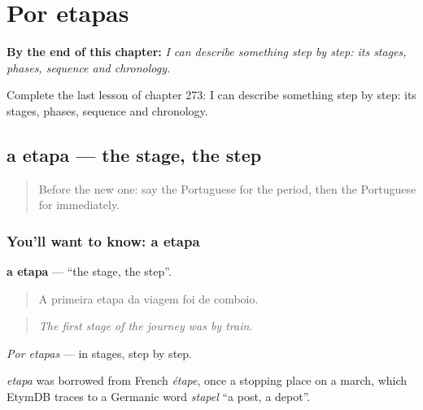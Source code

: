 
\chapter{Por etapas}
\label{ch:pt-por-etapas}

\begin{chapteropening}
\textbf{By the end of this chapter:} \emph{I can describe something step by step: its stages, phases, sequence and chronology.}

Complete the last lesson of chapter 273: I can describe something step by step: its stages, phases, sequence and chronology.
\end{chapteropening}

\section[a etapa]{a etapa — the stage, the step}

\label{lesson:PT-C273-etapa}



\begin{quote}
Before the new one: say the Portuguese for the period, then the Portuguese for immediately.
\end{quote}

\subsection*{You'll want to know: a etapa}
\textbf{a etapa} — \textquotedblleft{}the stage, the step\textquotedblright{}.

\begin{quote}
A primeira etapa da viagem foi de comboio.
\end{quote}

\begin{quote}
\emph{The first stage of the journey was by train.}
\end{quote}

\emph{Por etapas} — in stages, step by step.

\begin{cousinweb}
\emph{etapa} was borrowed from French \emph{étape}, once a stopping place on a march, which EtymDB traces to a Germanic word \emph{stapel} \textquotedblleft{}a post, a depot\textquotedblright{}.
\end{cousinweb}

